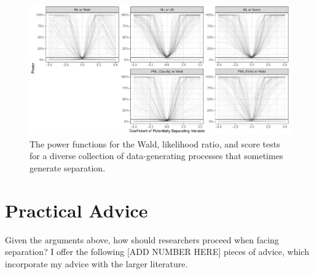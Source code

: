 \documentclass[
]{article}
\begin{document}
\begin{figure}[!h]
\includegraphics[scale = 0.7]{doc/fig/power-funs.pdf}
\caption{The power functions for the Wald, likelihood ratio, and score tests for a diverse collection of data-generating processes that sometimes generate separation.}\label{fig:power-funs}
\end{figure}

\hypertarget{practical-advice}{%
\section{Practical Advice}\label{practical-advice}}

Given the arguments above, how should researchers proceed when facing
separation? I offer the following {[}ADD NUMBER HERE{]} pieces of
advice, which incorporate my advice with the larger literature.
\end{document}
